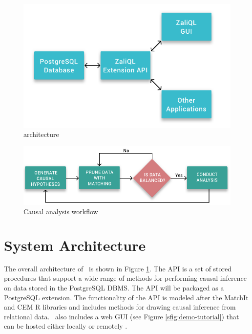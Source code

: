 
\begin{figure}
 \includegraphics[scale=0.25]{Figures/System-Overview.png}
  \vspace{-3.3mm} \caption{\GSQLB architecture}
 
  \label{fig:arch}
  \vspace{-3mm}
\end{figure}


\begin{figure}
  \includegraphics[scale=0.25]{Figures/Matching-Flowchart.png}
  \vspace{-3mm}\caption{Causal analysis workflow}

\label{fig:flowchart}
\vspace{-0.3cm}
\end{figure}



\section{System Architecture}

The overall architecture of \GSQL\ is shown in Figure \ref{fig:arch}.
The API is a set of stored procedures that support a wide
range of methods for performing causal inference on data stored in the
PostgreSQL DBMS. %
The API will be packaged as a PostgreSQL extension. %
The functionality of the API is modeled after the MatchIt and CEM R
libraries \cite{ho2005,iacus2009cem} and includes methods for drawing causal inference from relational data. \GSQL\ also includes a web GUI
(see Figure \ref{sfig:demo-tutorial}) that can be hosted either locally or
remotely . %


